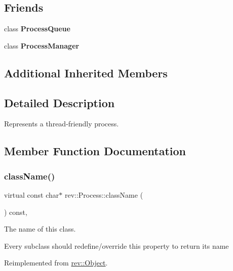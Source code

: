 \subsection*{Friends}
\begin{DoxyCompactItemize}
\item 
\mbox{\label{classrev_1_1_process_a3df6823da0f8a126bbb94e8cfe9d99b5}} 
class {\bfseries Process\+Queue}
\item 
\mbox{\label{classrev_1_1_process_ae1701c7594fe2cf1c96b951a52eb0396}} 
class {\bfseries Process\+Manager}
\end{DoxyCompactItemize}
\subsection*{Additional Inherited Members}


\subsection{Detailed Description}
Represents a thread-\/friendly process. 

\subsection{Member Function Documentation}
\mbox{\label{classrev_1_1_process_adc27ddf4c0f44dab54a5f797c7135c44}} 
\subsubsection{\texorpdfstring{className()}{className()}}
{\footnotesize\ttfamily virtual const char$\ast$ rev\+::\+Process\+::class\+Name (\begin{DoxyParamCaption}{ }\end{DoxyParamCaption}) const\hspace{0.3cm}{\ttfamily [inline]}, {\ttfamily [virtual]}}



The name of this class. 

Every subclass should redefine/override this property to return its name 

Reimplemented from \mbox{\hyperlink{classrev_1_1_object_a7a2013f91169479b65cf93afdc5d9a68}{rev\+::\+Object}}.



